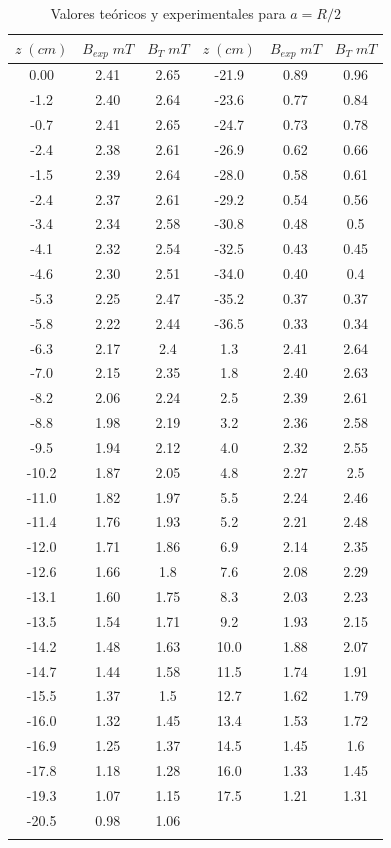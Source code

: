 \documentclass[a4paper,12pt,titlepage]{report}
\begin{document}
\begin{longtable}[t]{|c|c|c|c|c|c|}
    \hline
    $z \; (cm)$ & $B_{exp} \; mT$ & $B_T \; mT$ & $z \; (cm)$ & $B_{exp} \; mT$ & $B_T \; mT$ \\ \hline
    0.00     & 2.41 & 2.65 & -21.9 & 0.89 & 0.96 \\ \hline
    -1.2  & 2.40 & 2.64 & -23.6 & 0.77 & 0.84 \\ \hline
    -0.7  & 2.41 & 2.65 & -24.7 & 0.73 & 0.78 \\ \hline
    -2.4  & 2.38 & 2.61 & -26.9 & 0.62 & 0.66 \\ \hline
    -1.5  & 2.39 & 2.64 & -28.0 & 0.58 & 0.61 \\ \hline
    -2.4  & 2.37 & 2.61 & -29.2 & 0.54 & 0.56 \\ \hline
    -3.4  & 2.34 & 2.58 & -30.8 & 0.48 & 0.5  \\ \hline
    -4.1  & 2.32 & 2.54 & -32.5 & 0.43 & 0.45 \\ \hline
    -4.6  & 2.30 & 2.51 & -34.0 & 0.40 & 0.4  \\ \hline
    -5.3  & 2.25 & 2.47 & -35.2 & 0.37 & 0.37 \\ \hline
    -5.8  & 2.22 & 2.44 & -36.5 & 0.33 & 0.34 \\ \hline
    -6.3  & 2.17 & 2.4  & 1.3   & 2.41 & 2.64 \\ \hline
    -7.0  & 2.15 & 2.35 & 1.8   & 2.40 & 2.63 \\ \hline
    -8.2  & 2.06 & 2.24 & 2.5   & 2.39 & 2.61 \\ \hline
    -8.8  & 1.98 & 2.19 & 3.2   & 2.36 & 2.58 \\ \hline
    -9.5  & 1.94 & 2.12 & 4.0   & 2.32 & 2.55 \\ \hline
    -10.2 & 1.87 & 2.05 & 4.8   & 2.27 & 2.5  \\ \hline
    -11.0 & 1.82 & 1.97 & 5.5   & 2.24 & 2.46 \\ \hline
    -11.4 & 1.76 & 1.93 & 5.2   & 2.21 & 2.48 \\ \hline
    -12.0 & 1.71 & 1.86 & 6.9   & 2.14 & 2.35 \\ \hline
    -12.6 & 1.66 & 1.8  & 7.6   & 2.08 & 2.29 \\ \hline
    -13.1 & 1.60 & 1.75 & 8.3   & 2.03 & 2.23 \\ \hline
    -13.5 & 1.54 & 1.71 & 9.2   & 1.93 & 2.15 \\ \hline
    -14.2 & 1.48 & 1.63 & 10.0  & 1.88 & 2.07 \\ \hline
    -14.7 & 1.44 & 1.58 & 11.5  & 1.74 & 1.91 \\ \hline
    -15.5 & 1.37 & 1.5  & 12.7  & 1.62 & 1.79 \\ \hline
    -16.0 & 1.32 & 1.45 & 13.4  & 1.53 & 1.72 \\ \hline
    -16.9 & 1.25 & 1.37 & 14.5  & 1.45 & 1.6  \\ \hline
    -17.8 & 1.18 & 1.28 & 16.0  & 1.33 & 1.45 \\ \hline
    -19.3 & 1.07 & 1.15 & 17.5  & 1.21 & 1.31 \\ \hline
    -20.5 & 0.98 & 1.06 &       &      &      \\ \hline
    \caption{Valores teóricos y experimentales para $a=R/2$}
\end{longtable}
\end{document}
